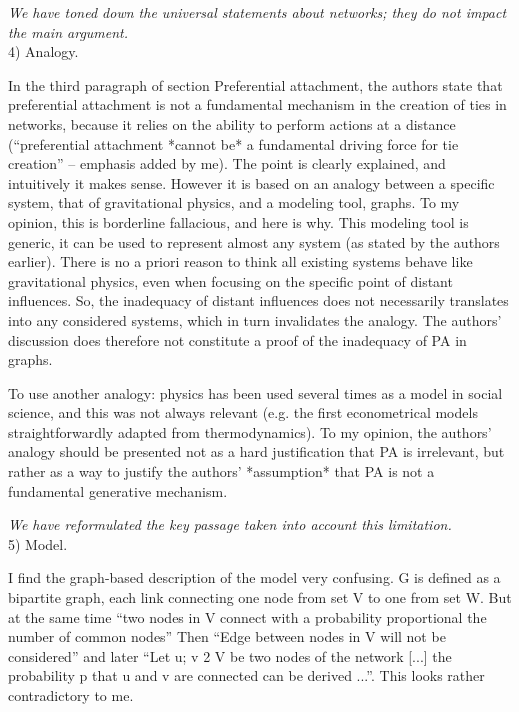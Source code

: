 \documentclass{article}
\begin{document}
\textit{We have toned down the universal statements about networks; they
  do not impact the main argument. } \\

4) Analogy.

In the third paragraph of section Preferential attachment, the authors
state that preferential attachment is not a fundamental mechanism in the
creation of ties in networks, because it relies on the ability to
perform actions at a distance (``preferential attachment *cannot be* a
fundamental driving force for tie creation'' – emphasis added by me). The
point is clearly explained, and intuitively it makes sense. However it
is based on an analogy between a specific system, that of gravitational
physics, and a modeling tool, graphs. To my opinion, this is borderline
fallacious, and here is why. This modeling tool is generic, it can be
used to represent almost any system (as stated by the authors
earlier). There is no a priori reason to think all existing systems
behave like gravitational physics, even when focusing on the specific
point of distant influences. So, the inadequacy of distant influences
does not necessarily translates into any considered systems, which in
turn invalidates the analogy. The authors’ discussion does therefore not
constitute a proof of the inadequacy of PA in graphs. 

To use another analogy: physics has been used several times as a model
in social science, and this was not always relevant (e.g. the first
econometrical models straightforwardly adapted from thermodynamics). To
my opinion, the authors’ analogy should be presented not as a hard
justification that PA is irrelevant, but rather as a way to justify the
authors’ *assumption* that PA is not a fundamental generative
mechanism. 

\textit{We have reformulated the key passage taken into account this
  limitation. } \\

5) Model.

I find the graph-based description of the model very confusing. G is
defined as a bipartite graph, each link connecting one node from set V
to one from set W. But at the same time ``two nodes in V connect with a
probability proportional the number of common nodes'' Then ``Edge between
nodes in V will not be considered'' and later ``Let u; v 2 V be two nodes
of the network [...] the probability p that u and v are connected can be
derived ...''. This looks rather contradictory to me. 
\end{document}
